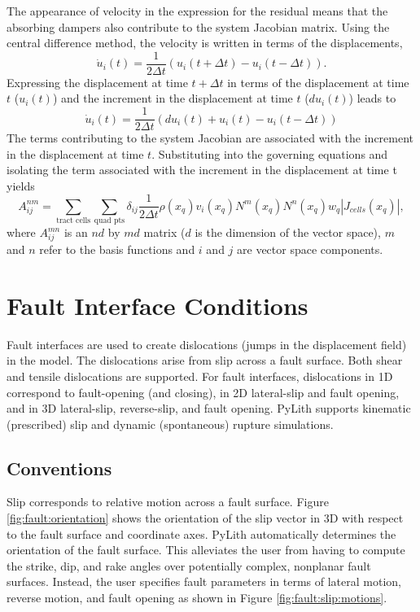 The appearance of velocity in the expression for the residual means
that the absorbing dampers also contribute to the system Jacobian
matrix. Using the central difference method, the velocity is written
in terms of the displacements,
\begin{equation}
\dot{u}_{i}(t)=\frac{1}{2\Delta t}(u_{i}(t+\Delta t)-u_{i}(t-\Delta t)).
\end{equation}
Expressing the displacement at time $t+\Delta t$ in terms of the
displacement at time $t$ ($u_{i}(t)$) and the increment in the displacement
at time $t$ ($du_{i}(t)$) leads to
\begin{equation}
\dot{u}_{i}(t)=\frac{1}{2\Delta t}(du_{i}(t)+u_{i}(t)-u_{i}(t-\Delta t))
\end{equation}
The terms contributing to the system Jacobian are associated with
the increment in the displacement at time $t$. Substituting into
the governing equations and isolating the term associated with the
increment in the displacement at time t yields
\begin{equation}
A_{ij}^{nm}=\sum_{\text{tract cells}}\sum_{\text{quad pts}}\delta_{ij}\frac{1}{2\Delta t}\rho(x_{q})v_{i}(x_{q})N^{m}(x_{q})N^{n}(x_{q})w_{q}|J_{cells}(x_{q})|,
\end{equation}
where $A_{ij}^{mn}$ is an $nd$ by $md$ matrix ($d$ is the dimension
of the vector space), $m$ and $n$ refer to the basis functions and
$i$ and $j$ are vector space components.


\section{Fault Interface Conditions}
\label{sec:fault}

Fault interfaces are used to create dislocations (jumps in the displacement
field) in the model. The dislocations arise from slip across a fault
surface. Both shear and tensile dislocations are supported. For fault
interfaces, dislocations in 1D correspond to fault-opening (and closing),
in 2D lateral-slip and fault opening, and in 3D lateral-slip, reverse-slip,
and fault opening. PyLith supports kinematic (prescribed) slip and
dynamic (spontaneous) rupture simulations.

\subsection{Conventions}

Slip corresponds to relative motion across a fault surface. Figure
\vref{fig:fault:orientation} shows the orientation of the slip vector
in 3D with respect to the fault surface and coordinate axes. PyLith
automatically determines the orientation of the fault surface. This
alleviates the user from having to compute the strike, dip, and rake
angles over potentially complex, nonplanar fault surfaces. Instead,
the user specifies fault parameters in terms of lateral motion, reverse
motion, and fault opening as shown in Figure \vref{fig:fault:slip:motions}.


